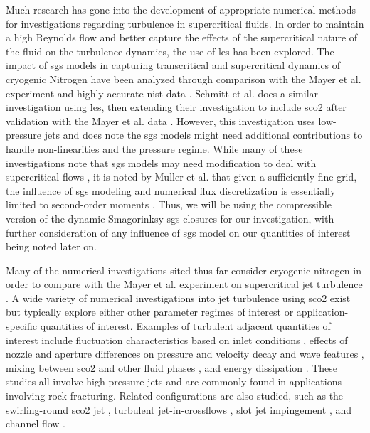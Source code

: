 Much research has gone into the development of appropriate numerical methods for investigations regarding turbulence in supercritical fluids. In order to maintain a high Reynolds flow and better capture the effects of the supercritical nature of the fluid on the turbulence dynamics, the use of \gls{les} has been explored. The impact of \gls{sgs} models in capturing transcritical and supercritical dynamics of cryogenic Nitrogen have been analyzed through comparison with the Mayer et al. experiment and highly accurate \gls{nist} data \cite{PETIT201361, doi:10.1080/00102200500287613, doi:10.1063/1.1795011, doi:10.1063/1.4937948, Same_LES}. Schmitt et al. does a similar investigation using \gls{les}, then extending their investigation to include \gls{sco2} after validation with the Mayer et al. data \cite{LES_N}. However, this investigation uses low-pressure jets and does note the \gls{sgs} models might need additional contributions to handle non-linearities and the pressure regime. While many of these investigations note that \gls{sgs} models may need modification to deal with supercritical flows \cite{LES_N, PETIT201361, doi:10.1063/1.4937948, doi:10.1080/00102200500287613}, it is noted by Muller et al. that given a sufficiently fine grid, the influence of \gls{sgs} modeling and numerical flux discretization is essentially limited to second-order moments \cite{doi:10.1063/1.4937948}. Thus, we will be using the compressible version of the dynamic Smagorinksy \gls{sgs} closures for our investigation, with further consideration of any influence of \gls{sgs} model on our quantities of interest being noted later on. 

Many of the numerical investigations sited thus far consider cryogenic nitrogen in order to compare with the Mayer et al. experiment on supercritical jet turbulence \cite{mayer2003raman}. A wide variety of numerical investigations into jet turbulence using \gls{sco2} exist but typically explore either other parameter regimes of interest or application-specific quantities of interest. Examples of turbulent adjacent quantities of interest include fluctuation characteristics based on inlet conditions \cite{ZHANG2022124125}, effects of nozzle and aperture differences on pressure and velocity decay \cite{en13102627} and wave features \cite{LIU2021108422}, mixing between \gls{sco2} and other fluid phases \cite{RAMAN2018}, and energy dissipation \cite{LI2020103650}. These studies all involve high pressure jets and are commonly found in applications involving rock fracturing. Related configurations are also studied, such as the swirling-round \gls{sco2} jet \cite{en14010106}, turbulent jet-in-crossflows \cite{ZHANG2022}, slot jet impingement \cite{ALKANDARI2022122949}, and channel flow \cite{ROGALEV2020}.

